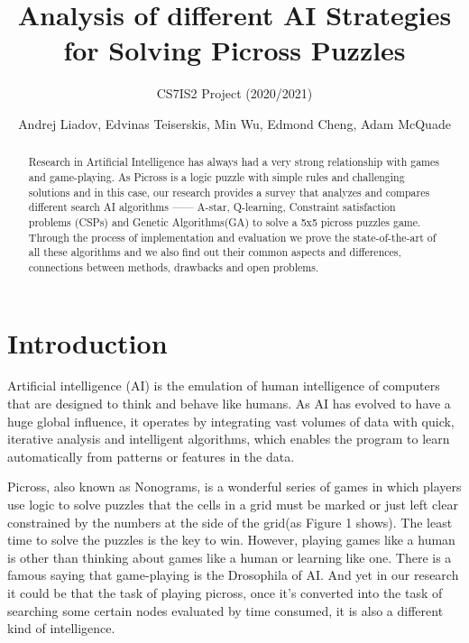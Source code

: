 \documentclass{svproc}
\begin{document}
	\mainmatter
	\title{Analysis of different AI Strategies for Solving Picross Puzzles
	}
	\subtitle{CS7IS2 Project (2020/2021)}
	\author{Andrej Liadov, Edvinas Teiserskis, Min Wu, Edmond Cheng, Adam McQuade}
	
	
	\maketitle              %
	
	\begin{abstract}
Research in Artificial Intelligence has always had a very strong relationship with games and game-playing. As Picross is a logic puzzle with simple rules and challenging solutions and in this case, our research provides a survey that analyzes and compares different search AI algorithms —— A-star, Q-learning, Constraint satisfaction problems (CSPs) and Genetic Algorithms(GA) to solve a 5x5 picross puzzles game. Through the process of implementation and evaluation we prove the state-of-the-art of all these algorithms and we also find out their common aspects and differences, connections between methods, drawbacks and open problems. 
	\end{abstract}
	
	
	

	\section{Introduction}
	Artificial intelligence (AI) is the emulation of human intelligence of computers that are designed to think and behave like humans. As AI has evolved to have a huge global influence, it operates by integrating vast volumes of data with quick, iterative analysis and intelligent algorithms, which enables the program to learn automatically from patterns or features in the data.
	
	Picross, also known as Nonograms, is a wonderful series of games in which players use logic to solve puzzles that the cells in a grid must be marked or just left clear constrained by the numbers at the side of the grid(as Figure 1 shows). The least time to solve the puzzles is the key to win. However, playing games like a human is other than thinking about games like a human or learning like one. There is a famous saying that game-playing is the Drosophila of AI. And yet in our research it could be that the task of playing picross, once it’s converted into the task of searching some certain nodes evaluated by time consumed, it is also a different kind of intelligence. 
	
\end{document}
